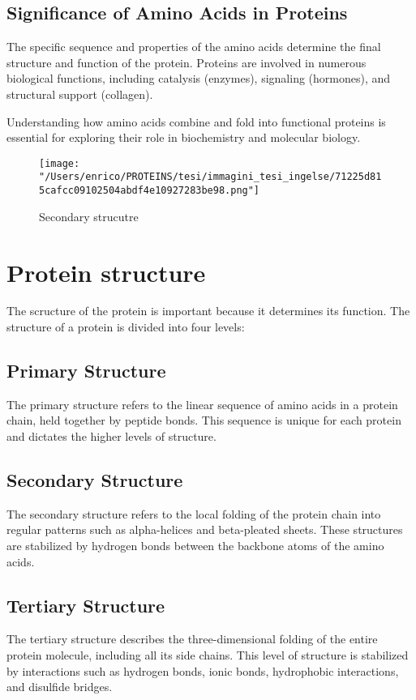 \documentclass[English, Lau, oneside]{sapthesis}
\begin{document}
\subsection{Significance of Amino Acids in Proteins}
The specific sequence and properties of the amino acids determine the final structure and function of the protein. Proteins are involved in numerous biological functions, including catalysis (enzymes), signaling (hormones), and structural support (collagen).

Understanding how amino acids combine and fold into functional proteins is essential for exploring their role in biochemistry and molecular biology.

\begin{figure}[H]
    \centering
    \texttt{[image: "/Users/enrico/PROTEINS/tesi/immagini\_tesi\_ingelse/71225d815cafcc09102504abdf4e10927283be98.png"]}
    \caption{Secondary strucutre}
\end{figure}



\section{Protein structure}
The scructure of the protein is important because it determines its function. 
The structure of a protein is divided into four levels:\cite{ref4}
\subsection{Primary Structure}
The primary structure refers to the linear sequence of amino acids in a protein chain, held together by peptide bonds. This sequence is unique for each protein and dictates the higher levels of structure.

\subsection{Secondary Structure}
The secondary structure refers to the local folding of the protein chain into regular patterns such as alpha-helices and beta-pleated sheets. These structures are stabilized by hydrogen bonds between the backbone atoms of the amino acids.

\subsection{Tertiary Structure}
The tertiary structure describes the three-dimensional folding of the entire protein molecule, including all its side chains. This level of structure is stabilized by interactions such as hydrogen bonds, ionic bonds, hydrophobic interactions, and disulfide bridges.
\end{document}
